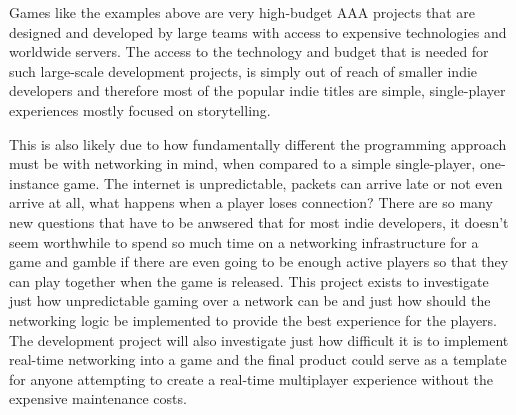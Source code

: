 Games like the examples above are very high-budget AAA projects that are designed and developed by large teams with access to expensive technologies and worldwide servers. The access to the technology and budget that is needed for such large-scale development projects, is simply out of reach of smaller indie developers and therefore most of the popular indie titles are simple, single-player experiences mostly focused on storytelling.

This is also likely due to how fundamentally different the programming approach must be with networking in mind, when compared to a simple single-player, one-instance game. The internet is unpredictable, packets can arrive late or not even arrive at all, what happens when a player loses connection? There are so many new questions that have to be anwsered that for most indie developers, it doesn't seem worthwhile to spend so much time on a networking infrastructure for a game and gamble if there are even going to be enough active players so that they can play together when the game is released. This project exists to investigate just how unpredictable gaming over a network can be and just how should the networking logic be implemented to provide the best experience for the players. The development project will also investigate just how difficult it is to implement real-time networking into a game and the final product could serve as a template for anyone attempting to create a real-time multiplayer experience without the expensive maintenance costs.


\newpage
